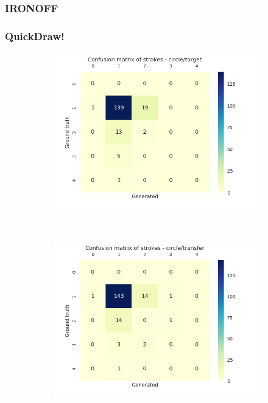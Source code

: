     \subsubsection{IRONOFF}
    \subsubsection{QuickDraw!}
      \begin{figure}
        \centering
        \begin{subfigure}[tb]{0.45\textwidth}
            \includegraphics[width=\textwidth]{images/sota/quickdraw_results/quickdraw_circle_target_strokes_heatmap.png}
        \end{subfigure}
        ~
        \begin{subfigure}[tb]{0.45\textwidth}
            \includegraphics[width=\textwidth]{images/sota/quickdraw_results/quickdraw_circle_transfer_strokes_heatmap.png}
        \end{subfigure}


\end{figure}
